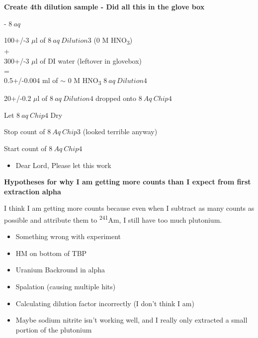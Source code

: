 \documentclass[idxtotoc,hyperref,openany,oneside]{labbook} %
\newcommand{\cmark}{\ding{51}}%
\newcommand{\done}{\rlap{$\square$}{\raisebox{2pt}{\large\hspace{1pt}\cmark}}%
  \hspace{-2.5pt}}
\newcommand{\tss}{\textsuperscript}
\newcommand{\tsbs}{\textsubscript}
\begin{document}

\textbf{Create 4th dilution sample - Did all this in the glove box}
\begin{todolist}
\item[\done]{- $\boxed{8\ aq}$}
\end{todolist}
\begin{center}
  100+/-3 $\mu$l of $\boxed{8\ aq\ Dilution3}$
  (0 M HNO\tsbs{3})\\
  +\\
  300+/-3 $\mu$l of DI water (leftover in glovebox)\\
  =\\
  0.5+/-0.004 ml of $\sim$
  0 M HNO\tsbs{3} $\boxed{8\ aq\ Dilution4}$
\end{center}
\begin{center}
  20+/-0.2 $\mu$l of $\boxed{8\ aq\ Dilution4}$ dropped onto
  $\boxed{8\ Aq\ Chip4}$
\end{center}
\begin{todolist}
\item[\done]{Let $\boxed{8\ aq\ Chip4}$ Dry}
\item[\done]{Stop count of $\boxed{8\ Aq\ Chip3}$ (looked terrible anyway)}
\item[\done]{Start count of $\boxed{8\ Aq\ Chip4}$}
  \begin{itemize}
  \item{Dear Lord, Please let this work}
  \end{itemize}
\end{todolist}

\textbf{Hypotheses for why I am getting more counts than I expect from first extraction alpha}

I think I am getting more counts because even when I subtract as many counts as possible
and attribute them to \tss{241}Am, I still have too much plutonium.
\begin{itemize}
\item{Something wrong with experiment}
\item{HM on bottom of TBP}
\item{Uranium Backround in alpha}
\item{Spalation (causing multiple hits)}
\item{Calculating dilution factor incorrectly (I don't think I am)}
\item{Maybe sodium nitrite isn't working well, and I really only extracted
  a small portion of the plutonium}
\end{itemize}
\end{document}
